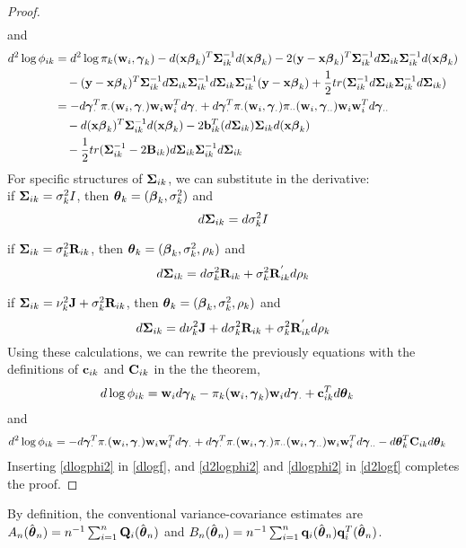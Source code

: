\begin{proof}
\begin{align*}
\end{align*}
and
\begin{align*}
d^{2}\log \phi_{ik}&=d^{2}\log \pi_{k}(\mathbf w_{i},\boldsymbol\gamma_k)-d(\mathbf x\boldsymbol \beta_{k})^{T}\boldsymbol\Sigma_{ik}^{-1}d(\mathbf x\boldsymbol \beta_{k})-2(\mathbf y-\mathbf x\boldsymbol \beta_{k})^{T}\boldsymbol\Sigma_{ik}^{-1}d\boldsymbol\Sigma_{ik}\boldsymbol\Sigma_{ik}^{-1}d(\mathbf x\boldsymbol\beta_{k})\\
&\quad-(\mathbf y-\mathbf x\boldsymbol \beta_{k})^{T}\boldsymbol\Sigma_{ik}^{-1}d\boldsymbol\Sigma_{ik}\boldsymbol\Sigma_{ik}^{-1}d\boldsymbol\Sigma_{ik}\boldsymbol\Sigma_{ik}^{-1}(\mathbf y-\mathbf x\boldsymbol\beta_{k})+\frac{1}{2}tr(\boldsymbol\Sigma_{ik}^{-1}d\boldsymbol\Sigma_{ik}\boldsymbol\Sigma_{ik}^{-1}d\boldsymbol\Sigma_{ik})\\
&=-d\boldsymbol\gamma_{\cdot}^{T}\pi_{\cdot}(\mathbf w_{i},\boldsymbol\gamma_{\cdot})\mathbf w_{i}\mathbf w_{i}^{T}d\boldsymbol\gamma_{\cdot}+d\boldsymbol\gamma_{\cdot}^{T}\pi_{\cdot}(\mathbf w_{i},\boldsymbol\gamma_{\cdot})\pi_{\cdot\cdot}(\mathbf w_{i},\boldsymbol\gamma_{\cdot\cdot})\mathbf w_{i}\mathbf w_{i}^{T}d\boldsymbol\gamma_{\cdot\cdot}\\
&\quad-d(\mathbf x\boldsymbol \beta_{k})^{T}\boldsymbol\Sigma_{ik}^{-1}d(\mathbf x\boldsymbol \beta_{k})-2\mathbf b_{ik}^{T}(d\boldsymbol\Sigma_{ik})\boldsymbol\Sigma_{ik}d(\mathbf x\boldsymbol\beta_{k})\\
&\quad-\frac{1}{2}tr(\boldsymbol\Sigma_{ik}^{-1}-2\mathbf B_{ik})d\boldsymbol\Sigma_{ik}\boldsymbol\Sigma_{ik}^{-1}d\boldsymbol\Sigma_{ik}
\end{align*}
For specific structures of $\boldsymbol\Sigma_{ik}$, we can substitute in the derivative:\\

if $\boldsymbol\Sigma_{ik}=\sigma_{k}^{2}I$, then $\boldsymbol\theta_{k}=(\boldsymbol\beta_{k},\sigma^{2}_{k})$ and
$$d\boldsymbol\Sigma_{ik}=d\sigma_{k}^{2}I$$

if $\boldsymbol\Sigma_{ik}=\sigma_{k}^{2}\mathbf R_{ik}$, then $\boldsymbol\theta_{k}=(\boldsymbol\beta_{k},\sigma^{2}_{k},\rho_{k})$ and
$$d\boldsymbol\Sigma_{ik}=d\sigma_{k}^{2}\mathbf R_{ik} +\sigma_{k}^{2}\mathbf R^{'}_{ik}d\rho_{k}$$

if $\boldsymbol\Sigma_{ik}=\nu_{k}^{2}\mathbf J+\sigma_{k}^{2}\mathbf R_{ik}$, then $\boldsymbol\theta_{k}=(\boldsymbol\beta_{k},\sigma^{2}_{k},\rho_{k})$ and
$$d\boldsymbol\Sigma_{ik}=d\nu_{k}^{2}\mathbf J + d\sigma_{k}^{2}\mathbf R_{ik} +\sigma_{k}^{2}\mathbf R^{'}_{ik}d\rho_{k}$$
Using these calculations, we can rewrite the previously equations with the definitions of $\mathbf c_{ik}$ and $\mathbf C_{ik}$ in the the theorem,
\begin{align}\label{dlogphi2}
d\log \phi_{ik}&=\mathbf w_{i} d\boldsymbol \gamma_{k} -\pi_{k}(\mathbf w_{i},\boldsymbol\gamma_k)\mathbf w_{i}d\boldsymbol\gamma_{\cdot}+\mathbf c^{T}_{ik}d\boldsymbol\theta_{k} 
\end{align}
and
\begin{align}\label{d2logphi2}
d^{2}\log \phi_{ik}
&=-d\boldsymbol\gamma_{\cdot}^{T}\pi_{\cdot}(\mathbf w_{i},\boldsymbol\gamma_{\cdot})\mathbf w_{i}\mathbf w_{i}^{T}d\boldsymbol\gamma_{\cdot}+d\boldsymbol\gamma_{\cdot}^{T}\pi_{\cdot}(\mathbf w_{i},\boldsymbol\gamma_{\cdot})\pi_{\cdot\cdot}(\mathbf w_{i},\boldsymbol\gamma_{\cdot\cdot})\mathbf w_{i}\mathbf w_{i}^{T}d\boldsymbol\gamma_{\cdot\cdot}-d\boldsymbol\theta_{k}^{T}\mathbf C_{ik}d\boldsymbol\theta_{k}
\end{align}
Inserting \eqref{dlogphi2} in \eqref{dlogf}, and \eqref{d2logphi2} and \eqref{dlogphi2} in \eqref{d2logf} completes the proof.
\end{proof}
By definition, the conventional variance-covariance estimates are\\ 
$A_{n}(\hat{\boldsymbol\theta}_{n})=n^{-1}\sum_{i=1}^{n}\mathbf Q_{i}(\hat{\boldsymbol \theta}_{n})$ and $B_{n}(\hat{\boldsymbol\theta}_{n})=n^{-1}\sum_{i=1}^{n}\mathbf q_{i}(\hat{\boldsymbol\theta}_{n})\mathbf q_{i}^{T}(\hat{\boldsymbol\theta}_{n})$. 


